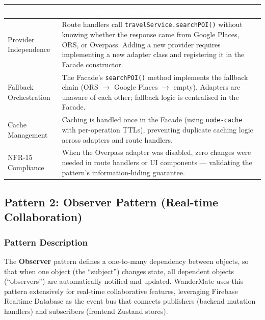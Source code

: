\documentclass[12pt, a4paper]{article}
\newcommand{\thcell}[1]{\textcolor{white}{\textbf{\small #1}}}
\newcommand{\code}[1]{\texttt{\small #1}}
\begin{document}
\begin{longtable}{L{3.5cm} L{10cm}}
\toprule
{}
\thcell{Concern} & \thcell{How the Pattern Addresses It} \\
\midrule
\endhead
\bottomrule
\endfoot

Provider Independence & Route handlers call \code{travelService.searchPOI()} without knowing whether the response came from Google Places, ORS, or Overpass. Adding a new provider requires implementing a new adapter class and registering it in the Facade constructor. \\

Fallback Orchestration & The Facade's \code{searchPOI()} method implements the fallback chain (ORS $\to$ Google Places $\to$ empty). Adapters are unaware of each other; fallback logic is centralised in the Facade. \\

Cache Management & Caching is handled once in the Facade (using \code{node-cache} with per-operation TTLs), preventing duplicate caching logic across adapters and route handlers. \\

NFR-15 Compliance & When the Overpass adapter was disabled, zero changes were needed in route handlers or UI components --- validating the pattern's information-hiding guarantee. \\

\end{longtable}

\subsection{Pattern 2: Observer Pattern (Real-time Collaboration)}

\subsubsection{Pattern Description}

The \textbf{Observer} pattern defines a one-to-many dependency between objects, so that when one object (the ``subject'') changes state, all dependent objects (``observers'') are automatically notified and updated. WanderMate uses this pattern extensively for real-time collaborative features, leveraging Firebase Realtime Database as the event bus that connects publishers (backend mutation handlers) and subscribers (frontend Zustand stores).
\end{document}
